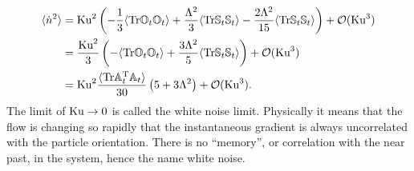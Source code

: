 \documentclass[thesis.tex]{subfiles}
\begin{document}
\begin{align}
	\langle \dot n^2\rangle &=\ku^2 \left(-\frac{1}{3}\langle\tr\ma O_t\ma O_t\rangle +  \frac{\Lambda^2}{3}\langle\tr\ma S_t \ma S_t\rangle - \frac{2\Lambda^2}{15}\langle\tr\ma S_t\ma S_t \rangle\right) + \mathcal O(\ku^3)  \nn\\
	&= \frac{\ku^2}{3}\left(-\langle\tr\ma O_t\ma O_t\rangle +  \frac{3\Lambda^2}{5}\langle\tr\ma S_t \ma S_t\rangle\right) + \mathcal O(\ku^3)  \nn\\
	&= \ku^2\frac{\langle\tr\ma A_t\transpose \ma A_t\rangle}{30}\left(5 + 3 \Lambda^2\right)+ \mathcal O(\ku^3).  \eqnlab{ku2}
\end{align}
The limit of $\mbox{Ku}\to0$ is called the white noise limit. Physically it means that the flow is changing so rapidly that the instantaneous gradient is always uncorrelated with the particle orientation. There is no ``memory'', or correlation with the near past, in the system, hence the name white noise.
\end{document}
